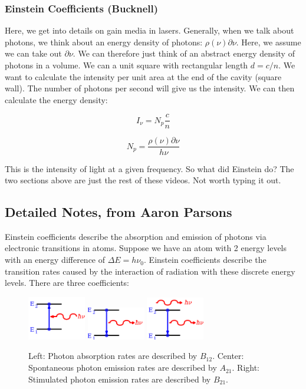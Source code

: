 \documentclass{article}
\def\ato{{A_{21}}}
\def\ato{{A_{21}}}
\def\ato{{A_{21}}}
\begin{document}
\subsubsection{Einstein Coefficients (Bucknell)}

Here, we get into details on gain media in lasers. Generally, when we talk about photons, we think about an energy density of photons: $\rho(\nu) \partial \nu$. Here, we assume we can take out $\partial \nu$. We can therefore just think of an abstract energy density of photons in a volume. We can a unit square with rectangular length $d=c/n$. We want to calculate the intensity per unit area at the end of the cavity (square wall). The number of photons per second will give us the intensity. We can then calculate the energy density:

\begin{equation}
    I_\nu = N_p \frac{c}{n}
\end{equation}

\begin{equation}
    N_p = \frac{\rho(\nu)\partial \nu}{h \nu}
\end{equation}

This is the intensity of light at a given frequency. So what did Einstein do? The two sections above are just the rest of these videos. Not worth typing it out.

\subsection{Detailed Notes, from Aaron Parsons}

Einstein coefficients describe the absorption and emission of photons via electronic transitions in atoms.  
Suppose we have an atom with 2 energy levels with an energy difference of $\Delta E=h\nu_0$.  Einstein coefficients describe the 
transition rates caused by the interaction of radiation with these discrete energy
levels. There are three coefficients:

\begin{figure}\centering
\includegraphics[width=1in]{figures/B12.png}
\includegraphics[width=1in]{figures/A21.png}
\includegraphics[width=1in]{figures/B21.png}
\caption{Left: Photon absorption rates are described by $B_{12}$.  Center: Spontaneous photon emission rates are described by $\ato$.  Right: Stimulated photon emission rates are described by $B_{21}$.}
\end{figure}
\end{document}
